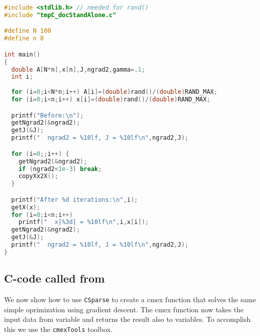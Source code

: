\documentclass[11pt]{article}
\newcommand{\CS}{\texttt{CSparse}}
\newcommand{\CMEX}{\texttt{cmexTools}}
\begin{document}
\begin{lstlisting}[language=C]
#include <stdlib.h> // needed for rand()
#include "tmpC_docStandAlone.c"

#define N 100
#define n 8

int main()
{
  double A[N*n],x[n],J,ngrad2,gamma=.1;
  int i;
  
  for (i=0;i<N*n;i++) A[i]=(double)rand()/(double)RAND_MAX;
  for (i=0;i<n;i++) x[i]=(double)rand()/(double)RAND_MAX;

  printf("Before:\n");
  getNgrad2(&ngrad2);   
  getJ(&J);             
  printf("  ngrad2 = %10lf, J = %10lf\n",ngrad2,J);

  for (i=0;;i++) {
    getNgrad2(&ngrad2);
    if (ngrad2<1e-3) break;
    copyXx2X();
  } 

  printf("After %d iterations:\n",i);
  getX(x); 
  for (i=0;i<n;i++) 
    printf("  x[%3d] = %10lf\n",i,x[i]);
  getNgrad2(&ngrad2);   
  getJ(&J);             
  printf("  ngrad2 = %10lf, J = %10lf\n",ngrad2,J);
}
\end{lstlisting}

\subsection{C-code called from \matlab{}}

We now show how to use \CS{} to create a cmex \matlab{} function that
solves the same simple oprimization using gradient descent. The cmex
function now takes the input data from \matlab{} variable and returns
the result also to \matlab{} variables. To accomplish this we use the
\CMEX{} toolbox.

\medskip
\end{document}
